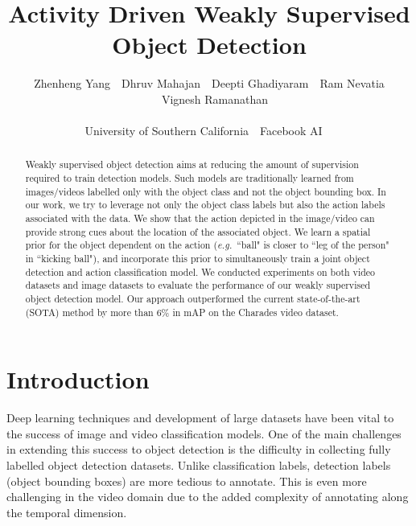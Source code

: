 \documentclass[10pt,twocolumn,letterpaper]{article}
\def\eg{\emph{e.g.}}
\begin{document}
\title{Activity Driven Weakly Supervised Object Detection}


\author{
Zhenheng Yang~~Dhruv Mahajan~~Deepti Ghadiyaram~~Ram Nevatia\\
~~Vignesh Ramanathan\\
\\
University of Southern California~~Facebook AI~~\\
}

\maketitle
\vspace{-0.5\baselineskip}
\begin{abstract}
\vspace{-0.6\baselineskip}
    Weakly supervised object detection aims at reducing the amount of supervision required to train detection models. Such models are traditionally learned from images/videos labelled only with the object class and not the object bounding box. In our work, we try to leverage not only the object class labels but also the action labels associated with the data. We show that the action depicted in the image/video can provide strong cues about the location of the associated object. We learn a spatial prior for the object dependent on the action (\eg~``ball" is closer to ``leg of the person" in ``kicking ball"), and incorporate this prior to simultaneously train a joint object detection and action classification model. We conducted experiments on both video datasets and image datasets to evaluate the performance of our weakly supervised object detection model. Our approach outperformed the current state-of-the-art (SOTA) method by more than 6\% in mAP on the Charades video dataset.

    




\vspace{-0.3\baselineskip}
\end{abstract}
 \vspace{-1.0\baselineskip}
\section{Introduction}
\vspace{-0.4\baselineskip}
\label{sec:intro}

Deep learning techniques and development of large datasets have been vital to the success of image and video classification models. One of the main challenges in extending this success to object detection is the difficulty in collecting fully labelled object detection datasets. Unlike classification labels, detection labels (object bounding boxes) are more tedious to annotate. This is even more challenging in the video domain due to the added complexity of annotating along the temporal dimension.
\end{document}
